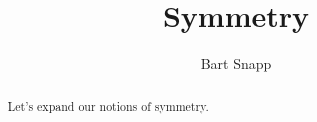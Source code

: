 \documentclass[handout,nooutcomes,noauthor]{ximera}
\title{Symmetry}
\author{Bart Snapp}
\begin{document}
\begin{abstract}
  Let's expand our notions of symmetry.
\end{abstract}
\maketitle


\begin{listSectionOutcomes}
\item 
\end{listSectionOutcomes}
\end{document}
